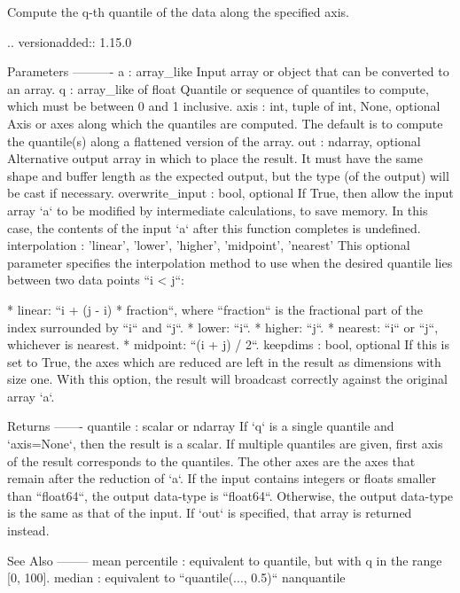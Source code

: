 \begin{DoxyVerb}Compute the q-th quantile of the data along the specified axis.

.. versionadded:: 1.15.0

Parameters
----------
a : array_like
    Input array or object that can be converted to an array.
q : array_like of float
    Quantile or sequence of quantiles to compute, which must be between
    0 and 1 inclusive.
axis : {int, tuple of int, None}, optional
    Axis or axes along which the quantiles are computed. The
    default is to compute the quantile(s) along a flattened
    version of the array.
out : ndarray, optional
    Alternative output array in which to place the result. It must
    have the same shape and buffer length as the expected output,
    but the type (of the output) will be cast if necessary.
overwrite_input : bool, optional
    If True, then allow the input array `a` to be modified by intermediate
    calculations, to save memory. In this case, the contents of the input
    `a` after this function completes is undefined.
interpolation : {'linear', 'lower', 'higher', 'midpoint', 'nearest'}
    This optional parameter specifies the interpolation method to
    use when the desired quantile lies between two data points
    ``i < j``:

        * linear: ``i + (j - i) * fraction``, where ``fraction``
          is the fractional part of the index surrounded by ``i``
          and ``j``.
        * lower: ``i``.
        * higher: ``j``.
        * nearest: ``i`` or ``j``, whichever is nearest.
        * midpoint: ``(i + j) / 2``.
keepdims : bool, optional
    If this is set to True, the axes which are reduced are left in
    the result as dimensions with size one. With this option, the
    result will broadcast correctly against the original array `a`.

Returns
-------
quantile : scalar or ndarray
    If `q` is a single quantile and `axis=None`, then the result
    is a scalar. If multiple quantiles are given, first axis of
    the result corresponds to the quantiles. The other axes are
    the axes that remain after the reduction of `a`. If the input
    contains integers or floats smaller than ``float64``, the output
    data-type is ``float64``. Otherwise, the output data-type is the
    same as that of the input. If `out` is specified, that array is
    returned instead.

See Also
--------
mean
percentile : equivalent to quantile, but with q in the range [0, 100].
median : equivalent to ``quantile(..., 0.5)``
nanquantile


\end{DoxyVerb}
